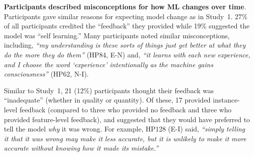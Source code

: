 
\textbf{Participants described misconceptions for how ML changes over time}.
%
Participants gave similar reasons for expecting model change as in Study~1. 27\% of all participants credited the ``feedback'' they provided while 19\% suggested the model was ``self learning.'' Many participants noted similar misconceptions, including, \textit{``my understanding is these sorts of things just get better at what they do the more they do them''} (HP84, E-N) and,
 \textit{``it learns with each new experience, and I choose the word `experience' intentionally as the machine gains consciousness''} (HP62, N-I).

Similar to Study~1, 21 (12\%) participants thought their feedback was ``inadequate'' (whether in quality or quantity). Of these, 17 provided instance-level feedback (compared to three who provided no feedback and three who provided feature-level feedback), and suggested that they would have preferred to tell the model \textit{why} it was wrong. 
For example, HP128 (E-I) said, \textit{``simply telling it that it was wrong may make it less accurate, but it is unlikely to make it more accurate without knowing how it made its mistake.''}

